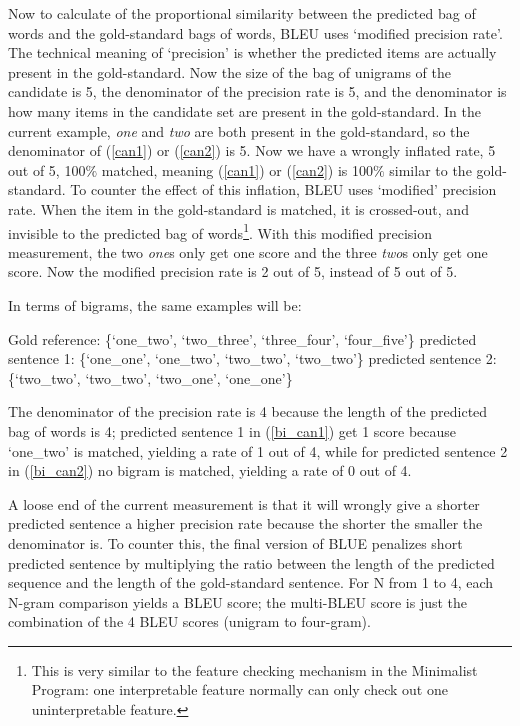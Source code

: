 \documentclass[final]{ua-thesis}
\numberwithin{equation}{section}
\begin{document}
Now to calculate of the proportional similarity between the predicted bag of words and the gold-standard bags of words, BLEU uses `modified precision rate'. The technical meaning of `precision' is whether the predicted items are actually present in the gold-standard. Now the size of the bag of unigrams of the candidate is 5, the denominator of the precision rate is 5, and the denominator is how many items in the candidate set are present in the gold-standard. In the current example, \textit{one} and \textit{two} are both present in the gold-standard, so the denominator of (\ref{can1}) or (\ref{can2}) is 5. 
Now we have a wrongly inflated rate, 5 out of 5, 100$\%$ matched, meaning (\ref{can1}) or (\ref{can2}) is 100$\%$ similar to the gold-standard. 
To counter the effect of this inflation, BLEU uses `modified' precision rate. 
When the item in the gold-standard is matched, it is crossed-out, and invisible to the predicted bag of words\footnote{This is very similar to the feature checking mechanism in the Minimalist Program: one interpretable feature normally can only check out one uninterpretable feature.}. 
With this modified precision measurement, the two \textit{one}s only get one score and the three \textit{two}s only get one score. Now the modified precision rate is 2 out of 5, instead of 5 out of 5. 

In terms of bigrams, the same examples will be:

\begin{exe}
\ex 
	\begin{xlist}
	\ex \label{bi_gold1} Gold reference: \{`one\_two',  `two\_three', `three\_four', `four\_five'\}
	\ex \label{bi_can1} predicted sentence 1: \{`one\_one',  `one\_two', `two\_two', `two\_two'\}
	\ex \label{bi_can2} predicted sentence 2: \{`two\_two', `two\_two', `two\_one', `one\_one'\}
	\end{xlist}
\end{exe}

The denominator of the precision rate is 4 because the length of the predicted bag of words is 4; predicted sentence 1 in (\ref{bi_can1}) get 1 score because `one\_two' is matched, yielding a rate of 1 out of 4, while for predicted sentence 2 in (\ref{bi_can2}) no bigram is matched, yielding a rate of 0 out of 4. 

A loose end of the current measurement is that it will wrongly give a shorter predicted sentence a higher precision rate because the shorter the smaller the denominator is. To counter this, the final version of BLUE penalizes short predicted sentence by multiplying the ratio between the length of the predicted sequence and the length of the gold-standard sentence. For N from 1 to 4, each N-gram comparison yields a BLEU score; the multi-BLEU score is just the combination of the 4 BLEU scores (unigram to four-gram). 
\end{document}
